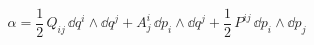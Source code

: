 \begin{equation}
  \alpha = \frac{1}{2}\,Q_{ij}\,\dd q^i\wedge\dd q^j
  + A^i_j\,\dd p_i\wedge\dd q^j + \frac{1}{2}\,P^{ij}\,\dd p_i\wedge\dd p_j
\label{alpha}
\end{equation}

